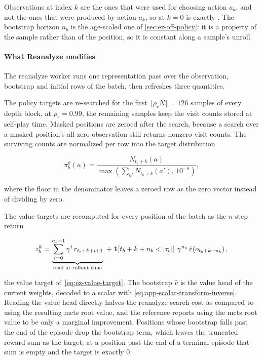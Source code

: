 Observations at index $k$ are the ones that were used for choosing action $a_k$,
and not the ones that were produced by action $a_k$, so  at
$k=0$ is exactly .
The bootstrap horizon $n_b$ is the age-scaled one of \cref{sec:ez-off-policy}: it is a property of
the sample rather than of the position, so it is constant along a sample's unroll.

\paragraph{What Reanalyze modifies}
The reanalyze worker runs one representation pass over the observation, bootstrap and initial rows
of the batch, then refreshes three quantities.

The policy targets are re-searched for the first $\lfloor\rho_r N\rfloor=126$ samples of every
depth block, at $\rho_r=0.99$, the remaining samples keep the visit counts stored at self-play
time.
Masked positions are zeroed after the search, because a search over a masked position's
all-zero observation still returns nonzero visit counts.
The surviving counts are normalized per row into the target distribution

\begin{equation}\label{eq:app-loss-policy-target}
  \pi^k_b(a)=\frac{N_{t_b+k}(a)}{\max\!\left(\sum_{a'}N_{t_b+k}(a'),\,10^{-8}\right)},
\end{equation}

where the floor in the denominator leaves a zeroed row as the zero vector instead of dividing by
zero.

The value targets are recomputed for every position of the batch as the $n$-step return

\begin{equation}\label{eq:app-loss-value-target}
  z^k_b=\underbrace{\sum_{i=0}^{n_b-1}\gamma^{i}\,r_{t_b+k+i+1}}_{\text{read at rollout time}}
        \;+\;\ind{t_b+k+n_b<|\tau_b|}\,\gamma^{n_b}\,
        \hat v\!\left(o_{t_b+k+n_b}\right),
\end{equation}

the value target of~\cref{eq:ez-value-target}.
The bootstrap $\hat v$ is the value head of the current weights, decoded to a scalar with
\cref{eq:app-scalar-transform-inverse}.
Reading the value head directly halves the reanalyze search cost as compared
to using the resulting \gls{mcts} root value, and the reference reports using the
\gls{mcts} root value to be only a marginal improvement.
Positions whose bootstrap falls past the end of the episode drop the bootstrap term, which
leaves the truncated reward sum as the target; at a position past the end of a terminal episode
that sum is empty and the target is exactly $0$.

